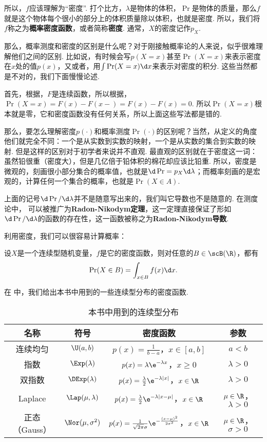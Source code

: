 所以，$f$应该理解为“密度”. 打个比方，$\lambda$是物体的体积，$\Pr$是物体的质量，那么$f$就是这个物体每个很小的部分上的体积质量除以体积，也就是密度. 所以，我们将$f$称之为\textbf{概率密度函数}，或者简称\textbf{密度}. 通常，$X$的密度记作$p_X$. 

那么，概率测度和密度的区别是什么呢？对于刚接触概率论的人来说，似乎很难理解他们之间的区别. 比如说，有时候会写$p(X=x)$甚至$\Pr(X=x)$来表示密度在$x$处的值$p(x)$，又或者，用$\int\Pr(X=x)\d x$来表示对密度的积分. 这些当然都是不对的，我们下面慢慢论述. 

首先，根据，$F$是连续函数，所以根据，$\Pr(X=x)=F(x)-F(x-)=F(x)-F(x)=0$. 所以$\Pr(X=x)$根本就是零，它和密度函数没有任何关系，所以上面这些写法都是错的. 

那么，要怎么理解密度$p(\cdot)$和概率测度$\Pr(\cdot)$的区别呢？当然，从定义的角度他们就完全不同：一个是从实数到实数的映射，一个是从实数的集合到实数的映射. 但是这样的区别对于初学者来说并不直观. 最直观的区别就在于密度这一词：虽然铅很重（密度大），但是几亿倍于铅体积的棉花却应该比铅重. 所以，密度是微观的，刻画很小部分集合的概率值，也就是$\d\Pr=p_X\d \lambda$；而概率刻画的是宏观的，计算任何一个集合的概率，也就是$\Pr(X\in A)$.

\begin{remark}
    上面的记号$\d\Pr/\d\lambda$并不是随意写出来的，我们叫它导数也不是随意的. 在测度论中， 可以被推广为\textbf{Radon-Nikodym定理}，这一定理直接保证了形如$\d\Pr/\d\lambda$的函数的存在性，这一函数被称之为\textbf{Radon-Nikodym导数}. 
\end{remark}

利用密度，我们可以很容易计算概率：
\begin{theorem}\label{thm:continuous-prob}
设$X$是一个连续型随机变量，$f$是它的密度函数，则对任意的$B\in\scB(\R)$，都有
\[\Pr(X\in B)=\int_{x\in B}f(x)\d x.\]
\end{theorem}

在 中，我们给出本书中用到的一些连续型分布的密度函数. 

\begin{table}[htbp]
\centering
\begin{tabular}{cccc}
\toprule
名称 & 符号 & 密度函数 & 参数 \\
\midrule
连续均匀 & $\U(a,b)$ &$p(x)=\frac{1}{b-a}$，$x\in[a,b]$ & $a<b$ \\
指数 & $\Exp(\lambda)$ & $p(x)=\lambda \e^{-\lambda x}$，$x\geq 0$ & $\lambda>0$ \\
双指数 & $\DExp(\lambda)$ & $p(x)=\frac{\lambda}{2}\e^{-\lambda|x|}$，$x\in\R$ & $\lambda>0$ \\
Laplace & $\Lap(\mu,\lambda)$ & $p(x)=\frac{\lambda}{2}\e^{-\lambda|x-\mu|}$，$x\in\R$ & $\mu\in\R$，$\lambda>0$ \\
正态（Gauss） & $\Nor(\mu,\sigma^2)$ & $p(x)=\frac{1}{\sqrt{2\pi}\sigma}\e^{-\frac{(x-\mu)^2}{2\sigma^2}}$，$x\in\R$ & $\mu\in\R$，$\sigma>0$ \\
\bottomrule
\end{tabular}
\caption{本书中用到的连续型分布}
\label{tab:continuous-distribution}
\end{table}

